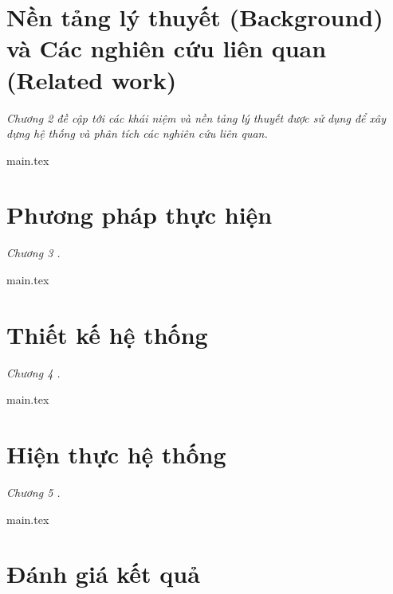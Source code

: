 \documentclass[a4paper, 12pt]{report}
\begin{document}
\chapter{Nền tảng lý thuyết (Background) và Các nghiên cứu liên quan (Related work)}\label{chap:chap2}
\thispagestyle{fancy} %

\textit{Chương 2 đề cập tới các khái niệm và nền tảng lý thuyết được sử dụng để xây dựng hệ thống và phân tích các nghiên cứu liên quan.}

{main.tex}

\chapter{Phương pháp thực hiện}\label{chap:chap3}
\thispagestyle{fancy} %

\textit{Chương 3 .}

{main.tex}

\chapter{Thiết kế hệ thống}\label{chap:chap4}
\thispagestyle{fancy} %

\textit{Chương 4 .}

{main.tex}

\chapter{Hiện thực hệ thống}\label{chap:chap5}
\thispagestyle{fancy} %

\textit{Chương 5 .}

{main.tex}

\chapter{Đánh giá kết quả}\label{chap:chap6}
\thispagestyle{fancy} %
\end{document}
